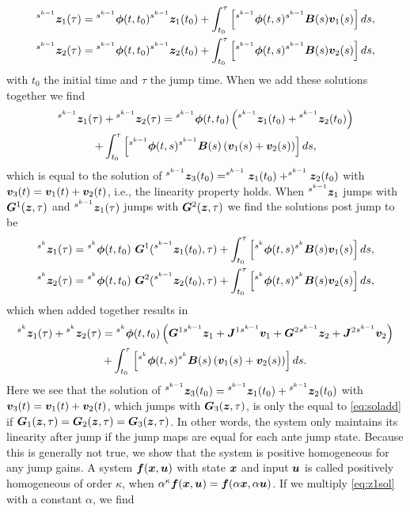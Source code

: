 \documentclass[../DC2019003Bouma.tex]{subfiles}
\begin{document}
\begin{align}
\hspace{0cm}^{s^{k-1}}{\boldsymbol{z}}_1(\tau) &= \hspace{0cm}^{s^{k-1}}\boldsymbol{\phi}(t,t_0)\hspace{0cm}^{s^{k-1}}{\boldsymbol{z}}_1(t_0) + \int_{t_0}^\tau \left[\hspace{0cm}^{s^{k-1}}\boldsymbol{\phi}(t,s)\hspace{0cm}^{s^{k-1}}{\boldsymbol{B}}(s){\boldsymbol{v}}_1(s)\right]ds,\\
\hspace{0cm}^{s^{k-1}}{\boldsymbol{z}}_2(\tau) &= \hspace{0cm}^{s^{k-1}}\boldsymbol{\phi}(t,t_0)\hspace{0cm}^{s^{k-1}}{\boldsymbol{z}}_2(t_0) + \int_{t_0}^\tau \left[\hspace{0cm}^{s^{k-1}}\boldsymbol{\phi}(t,s)\hspace{0cm}^{s^{k-1}}{\boldsymbol{B}}(s){\boldsymbol{v}}_2(s)\right]ds,
\end{align}
with $t_0$ the initial time and $\tau$ the jump time.
When we add these solutions together we find
\begin{multline}
^{s^{k-1}}{\boldsymbol{z}}_1(\tau) + \hspace{0cm}^{s^{k-1}}{\boldsymbol{z}}_2(\tau) = \hspace{0cm}^{s^{k-1}}\boldsymbol{\phi}(t,t_0)\left(\hspace{0cm}^{s^{k-1}}{\boldsymbol{z}}_1(t_0) + \hspace{0cm}^{s^{k-1}}{\boldsymbol{z}}_2(t_0)\right) \\+ \int_{t_0}^\tau \left[\hspace{0cm}^{s^{k-1}}\boldsymbol{\phi}(t,s)\hspace{0cm}^{s^{k-1}}{\boldsymbol{B}}(s)\left({\boldsymbol{v}}_1(s) + {\boldsymbol{v}}_2(s)\right)\right]ds,
\end{multline}
which is equal to the solution of $^{s^{k-1}}{\boldsymbol{z}}_3(t_0) = ^{s^{k-1}}{\boldsymbol{z}}_1(t_0) + ^{s^{k-1}}{\boldsymbol{z}}_2(t_0)$ with ${\boldsymbol{v}}_3(t) = {\boldsymbol{v}}_1(t) + {\boldsymbol{v}}_2(t)$, i.e., the linearity property holds. When $^{s^{k-1}}{\boldsymbol{z}}_1$ jumps with ${\boldsymbol{G}}^1({\boldsymbol{z}},\tau)$ and $^{s^{k-1}}{\boldsymbol{z}}_1(\tau)$ jumps with ${\boldsymbol{G}}^2({\boldsymbol{z}},\tau)$ we find the solutions post jump to be
\begin{align}
^{s^{k}}\zb_1(\tau) &= \ls^{s^{k}}\phib(t,t_0)\ \Gb^1(^{s^{k-1}}\zb_1(t_0),\tau) + \int_{t_0}^\tau \left[\ls^{s^{k}}\phib(t,s)\ls^{s^{k}}\Bb(s)\vb_1(s)\right]ds,\label{eq:z1sol}\\
^{s^{k}}\zb_2(\tau) &= \ls^{s^{k}}\phib(t,t_0)\ \Gb^2(^{s^{k-1}}\zb_2(t_0),\tau) + \int_{t_0}^\tau \left[\ls^{s^{k}}\phib(t,s)\ls^{s^{k}}\Bb(s)\vb_2(s)\right]ds,
\end{align}
which when added together results in
\begin{multline}
^{s^{k}}{\boldsymbol{z}}_1(\tau) + \hspace{0cm}^{s^{k}}{\boldsymbol{z}}_2(\tau) = \hspace{0cm}^{s^{k}}\boldsymbol{\phi}(t,t_0)\left({\boldsymbol{G}}^1 \hspace{0cm}^{s^{k-1}}{\boldsymbol{z}}_1 + {\boldsymbol{J}}^1\hspace{0cm}^{s^{k-1}}{\boldsymbol{v}}_1 + {\boldsymbol{G}}^2 \hspace{0cm}^{s^{k-1}}{\boldsymbol{z}}_2 + {\boldsymbol{J}}^2\hspace{0cm}^{s^{k-1}}{\boldsymbol{v}}_2\right) \\+ \int_{t_0}^\tau \left[\hspace{0cm}^{s^{k}}\boldsymbol{\phi}(t,s)\hspace{0cm}^{s^{k}}{\boldsymbol{B}}(s)\left({\boldsymbol{v}}_1(s) + {\boldsymbol{v}}_2(s)\right)\right]ds.\label{eq:soladd}
\end{multline}
Here we see that the solution of $\hspace{0cm}^{s^{k-1}}{\boldsymbol{z}}_3(t_0) = \hspace{0cm}^{s^{k-1}}{\boldsymbol{z}}_1(t_0) + \hspace{0cm}^{s^{k-1}}{\boldsymbol{z}}_2(t_0)$ with ${\boldsymbol{v}}_3(t) = {\boldsymbol{v}}_1(t) + {\boldsymbol{v}}_2(t)$, which jumps with ${\boldsymbol{G}}_3({\boldsymbol{z}},\tau)$, is only the equal to \eqref{eq:soladd} if ${\boldsymbol{G}}_1({\boldsymbol{z}},\tau) = {\boldsymbol{G}}_2({\boldsymbol{z}},\tau) = {\boldsymbol{G}}_3({\boldsymbol{z}},\tau)$. In other words, the system only maintains its linearity after jump if the jump maps are equal for each ante jump state. Because this is generally not true, we show that the system is positive homogeneous for any jump gains. A system ${\boldsymbol{f}}({\boldsymbol{x}},{\boldsymbol{u}})$ with state ${\boldsymbol{x}}$ and input ${\boldsymbol{u}}$ is called positively homogeneous of order $\kappa$, when $\alpha^{\kappa} {\boldsymbol{f}}({\boldsymbol{x}},{\boldsymbol{u}}) = {\boldsymbol{f}}(\alpha {\boldsymbol{x}}, \alpha {\boldsymbol{u}})$. If we multiply \eqref{eq:z1sol} with a constant $\alpha$, we find
\end{document}
